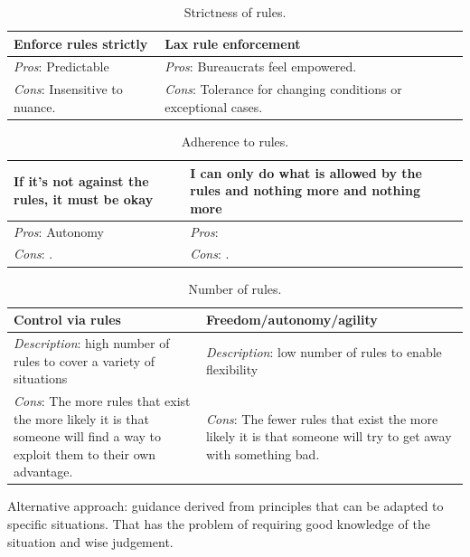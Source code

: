 \begin{center}
\begin{table}[ht]
\begin{tabular}{ | m{\dilemmatablewidth}| m{\dilemmatablewidth} | } 
  \hline
  \textbf{Enforce rules strictly} & 
  \textbf{Lax rule enforcement} \\ 
  \hline
  \textit{Pros}: Predictable &
  \textit{Pros}: Bureaucrats feel empowered. \\
  \hline
  \textit{Cons}: Insensitive to nuance. & 
  \textit{Cons}: Tolerance for changing conditions or exceptional cases.  \\  
  \hline
\end{tabular}
\caption{Strictness of rules.
}
\label{table:rule_strictness}
\end{table}
\end{center}

\begin{center}
\begin{table}[ht]
\begin{tabular}{ | m{\dilemmatablewidth}| m{\dilemmatablewidth} | } 
  \hline
  \textbf{If it's not against the rules, it must be okay} & 
  \textbf{I can only do what is allowed by the rules and nothing more and nothing more} \\ 
  \hline
  \textit{Pros}: Autonomy &
  \textit{Pros}:  \\
  \hline
  \textit{Cons}: . & 
  \textit{Cons}: .  \\  
  \hline
\end{tabular}
\caption{Adherence to rules.
}
\label{table:rule_adherence}
\end{table}
\end{center}





\begin{center}
\begin{table}[ht]
\begin{tabular}{ | m{\dilemmatablewidth}| m{\dilemmatablewidth} | } 
  \hline
  \textbf{Control via rules} & \textbf{Freedom/autonomy/agility} \\ 
  \hline
  \textit{Description}: high number of rules to cover a variety of situations & 
  \textit{Description}: low number of rules to enable flexibility \\ 
  \hline
  \textit{Cons}: The more rules that exist the more likely it is that someone will find a way to exploit them to their own advantage. & 
  \textit{Cons}: The fewer rules that exist the more likely it is that someone will try to get away with something bad. \\  
  \hline
\end{tabular}
\caption{Number of rules.
}
\label{table:number_of_rules}
\end{table}
\end{center}
Alternative approach: guidance derived from principles that can be adapted to specific situations. That has the problem of requiring good knowledge of the situation and wise judgement.

